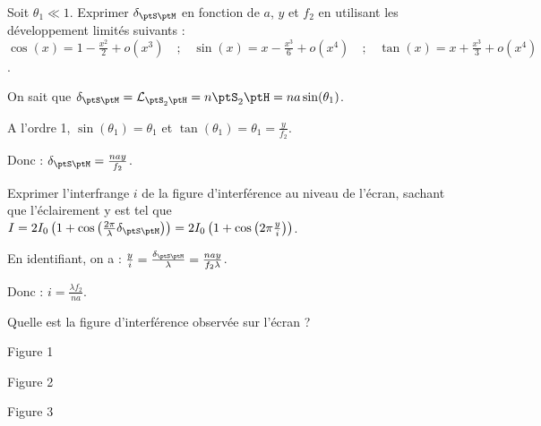
\begin{enonce}
	Soit $\theta_1\ll1$. Exprimer $\delta_{\ptS \ptM}$ en fonction de $a$, $y$ et $f_2$ en utilisant les développement limités suivants :
	$
	\cos(x)=1-\frac{x^2}{2}+o(x^3) \quad \text{;} \quad 
	\sin(x)=x-\frac{x^3}{6}+o(x^{4}) \quad \text{;} \quad 
	\tan(x)=x+\frac{x^3}{3}+o(x^{4})$.
\end{enonce}


\begin{corrige}
	On sait que $\delta_{\ptS \ptM}=\mathcal{L}_{\ptS_2 \ptH}=n \ptS_2 \ptH=na \sin(\theta_1)$.

	A l'ordre 1, $\sin(\theta_1)=\theta_1$ et $\tan(\theta_1)=\theta_1=\frac{y}{f_2}$.

	Donc : $\delta_{\ptS \ptM}=\frac{nay}{f_2}$.
\end{corrige}



\begin{enonce}
	Exprimer l'interfrange $i$ de la figure d'interférence au niveau de l'écran, sachant que l'éclairement y est tel que $I = 2I_0\left( 1 + \cos\left( \frac{2 \pi}{\lambda} \delta_{\ptS \ptM} \right) \right) = 2 I_0 \left( 1 + \cos\left(  2\pi\frac{y}{i} \right) \right)$.
\end{enonce}


\begin{corrige}
	En identifiant, on a : $\frac{y}{i}=\frac{\delta_{\ptS \ptM}}{\lambda}=\frac{nay}{f_2 \lambda}$.

	Donc : $i=\frac{\lambda f_2}{na}$.
\end{corrige}




\begin{enonce}
	Quelle est la figure d'interférence observée sur l'écran ?
	\begin{listeQCM3Colonnes}
		\item Figure 1
		\item Figure 2
		\item Figure 3
		\end{listeQCM3Colonnes}
		\smallskip
\end{enonce}
	
